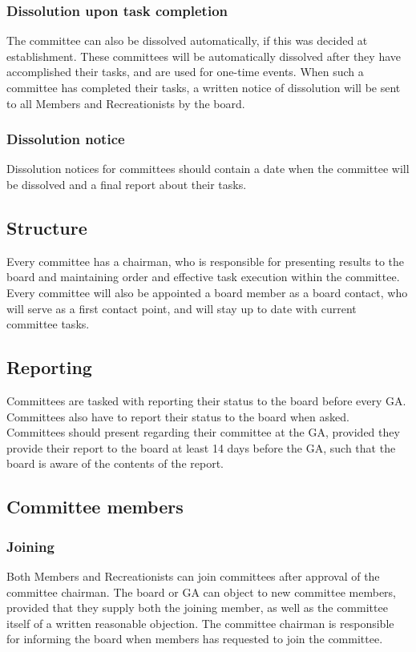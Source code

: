 \documentclass[a4paper]{article}
\begin{document}
\subsubsection{Dissolution upon task completion}
The committee can also be dissolved automatically, if this was decided at establishment. These committees will be automatically dissolved after they have accomplished their tasks, and are used for one-time events. When such a committee has completed their tasks, a written notice of dissolution will be sent to all { Members} and { Recreationists} by the board.

\subsubsection{Dissolution notice}
Dissolution notices for committees should contain a date when the committee will be dissolved and a final report about their tasks.

\subsection{Structure}
Every committee has a chairman, who is responsible for presenting results to the board and maintaining order and effective task execution within the committee. Every committee will also be appointed a board member as a board contact, who will serve as a first contact point, and will stay up to date with current committee tasks.

\subsection{Reporting}
Committees are tasked with reporting their status to the board before every { GA}. Committees also have to report their status to the board when asked. Committees should present regarding their committee at the { GA}, provided they provide their report to the board at least 14 days before the { GA}, such that the board is aware of the contents of the report.

\subsection{Committee members}
\subsubsection{Joining}
Both { Members} and { Recreationists} can join committees after approval of the committee chairman. The board or { GA} can object to new committee members, provided that they supply both the joining member, as well as the committee itself of a written reasonable objection. The committee chairman is responsible for informing the board when members has requested to join the committee.
\end{document}
